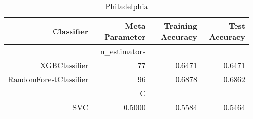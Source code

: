 
\begin{table}[H]
    \caption{Philadelphia}
    \centering
    \begin{tabular}{|r|r|r|r|}
        \hline
        Classifier &Meta Parameter &Training Accuracy
        &Test Accuracy\\
        \hline
        &n\_estimators &\multicolumn{2}{|r|}{}\\
        \hline
        XGBClassifier &77 &0.6471 &0.6471\\
        \hline
        RandomForestClassifier &96 &0.6878 &0.6862\\
        \hline
        &C &\multicolumn{2}{|r|}{}\\
        \hline
        SVC &0.5000 &0.5584 &0.5464\\
        \hline
    \end{tabular}
\end{table}
